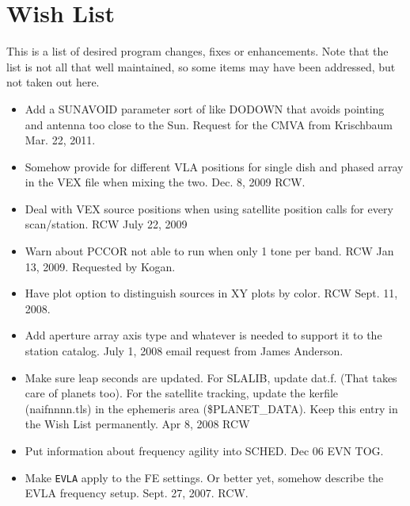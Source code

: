 \documentclass{report}
\begin{document}
\section{\label{SSEC:BUGS}Wish List}

This is a list of desired program changes, fixes or enhancements.  Note
that the list is not all that well maintained, so some items may have
been addressed, but not taken out here.


\begin{itemize}

\item Add a SUNAVOID parameter sort of like DODOWN that avoids pointing
      and antenna too close to the Sun.  Request for the CMVA from
      Krischbaum  Mar. 22, 2011.

\item Somehow provide for different VLA positions for single dish
      and phased array in the VEX file when mixing the two.  Dec. 8,
      2009 RCW.

\item Deal with VEX source positions when using satellite position
      calls for every scan/station.     RCW July 22, 2009

\item Warn about PCCOR not able to run when only 1 tone per band.  RCW
      Jan 13, 2009.  Requested by Kogan.

\item Have plot option to distinguish sources in XY plots by color.
      RCW  Sept. 11, 2008.

\item Add aperture array axis type and whatever is needed to support it
      to the station catalog.  July 1, 2008 email request from
      James Anderson.

\item Make sure leap seconds are updated.
      For SLALIB, update dat.f.  (That takes care of planets too).
      For the satellite tracking, update the kerfile (naifnnnn.tls) in the
         ephemeris area (\$PLANET\_DATA).
      Keep this entry in the Wish List permanently.  Apr 8, 2008 RCW

\item Put information about frequency agility into SCHED. Dec 06 EVN TOG.

\item Make {\tt EVLA} apply to the FE settings.  Or better yet, somehow
      describe the EVLA frequency setup.  Sept. 27, 2007.  RCW.


\end{itemize}
\end{document}

